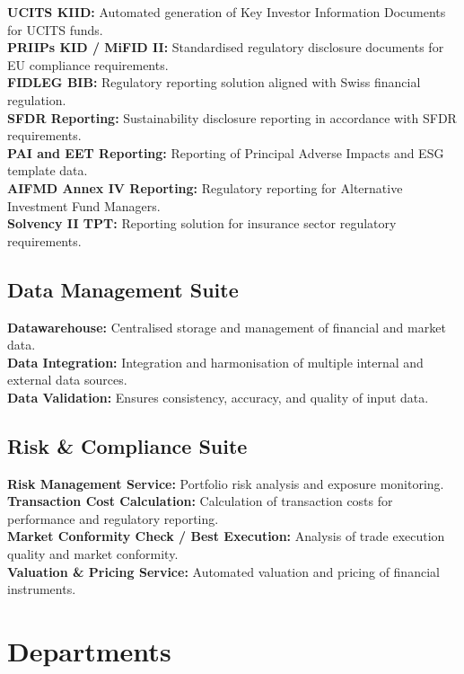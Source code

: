 \textbf{UCITS KIID:} Automated generation of Key Investor Information Documents for UCITS funds.\\
\textbf{PRIIPs KID / MiFID II:} Standardised regulatory disclosure documents for EU compliance requirements.\\
\textbf{FIDLEG BIB:} Regulatory reporting solution aligned with Swiss financial regulation.\\
\textbf{SFDR Reporting:} Sustainability disclosure reporting in accordance with SFDR requirements.\\
\textbf{PAI and EET Reporting:} Reporting of Principal Adverse Impacts and ESG template data.\\
\textbf{AIFMD Annex IV Reporting:} Regulatory reporting for Alternative Investment Fund Managers.\\
\textbf{Solvency II TPT:} Reporting solution for insurance sector regulatory requirements.

\subsection{Data Management Suite}

\textbf{Datawarehouse:} Centralised storage and management of financial and market data.\\
\textbf{Data Integration:} Integration and harmonisation of multiple internal and external data sources.\\
\textbf{Data Validation:} Ensures consistency, accuracy, and quality of input data.

\subsection{Risk \& Compliance Suite}

\textbf{Risk Management Service:} Portfolio risk analysis and exposure monitoring.\\
\textbf{Transaction Cost Calculation:} Calculation of transaction costs for performance and regulatory reporting.\\
\textbf{Market Conformity Check / Best Execution:} Analysis of trade execution quality and market conformity.\\
\textbf{Valuation \& Pricing Service:} Automated valuation and pricing of financial instruments.

\section{Departments}
